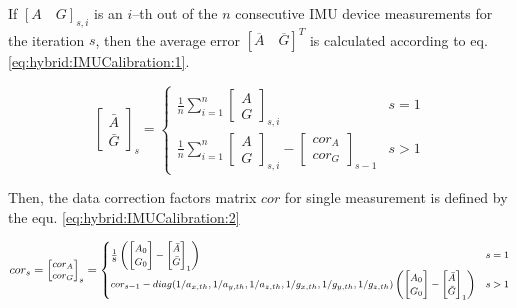 \documentclass[sensors,article,submit,moreauthors,pdftex,10pt,a4paper]{mdpi}
\begin{document}
	If $[A\quad G]_{s,i}$ is an $i$--th out of the $n$ consecutive IMU device measurements for the iteration $s$, then the average error $[\overline{A}\quad \overline{G}]^T$ is calculated according to eq. \ref{eq:hybrid:IMUCalibration:1}.
		
	\begin{equation}
		\begin{bmatrix} \bar{A} \\ \bar{G} \end{bmatrix}_s =
		\begin{cases}
			\frac{1}{n}\sum_{i=1}^{n}{\begin{bmatrix}A \\ G\end{bmatrix}_{s,i}} & s = 1\\
			\frac{1}{n}\sum_{i=1}^{n}{\begin{bmatrix}A \\ G\end{bmatrix}_{s,i} - \begin{bmatrix}cor_A\\ cor_G\end{bmatrix}_{s-1}} &  s > 1
		\end{cases}
		\label{eq:hybrid:IMUCalibration:1}
	\end{equation}
	
	Then, the data correction factors matrix $cor$ for single measurement is defined by the equ. \ref{eq:hybrid:IMUCalibration:2}
		
	\begin{equation}
		\footnotesize
		cor_s = \begin{bmatrix}cor_A\\ cor_G\end{bmatrix}_s =
		\begin{cases}
			\frac{1}{8}\left(\begin{bmatrix}A_0                                                                          \\ G_0\end{bmatrix} - \begin{bmatrix}\bar{A}\\ \bar{G}\end{bmatrix}_1\right) & s = 1\\
			cor_{s-1} - diag(1/a_{x,th},1/a_{y,th},1/a_{z,th},1/g_{x,th},1/g_{y,th},1/g_{z,th}) \left(\begin{bmatrix}A_0 \\ G_0\end{bmatrix} - \begin{bmatrix}\bar{A}\\ \bar{G}\end{bmatrix}_1\right) & s > 1
		\end{cases}
		\label{eq:hybrid:IMUCalibration:2}
	\end{equation}	
		
\end{document}
